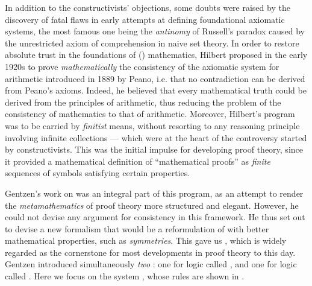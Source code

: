 In addition to the constructivists' objections, some doubts were raised by the
discovery of fatal flaws in early attempts at defining foundational axiomatic
systems, the most famous one being the \emph{antinomy} of Russell's paradox
caused by the unrestricted axiom of comprehension in naive set theory. In order
to restore absolute trust in the foundations of () mathematics, Hilbert
proposed in the early 1920s to prove \emph{mathematically} the consistency of
the axiomatic system for arithmetic introduced in 1889 by Peano, i.e.
that no contradiction can be derived from Peano's axioms. Indeed, he believed
that every mathematical truth could be derived from the principles of
arithmetic, thus reducing the problem of the consistency of mathematics to that
of arithmetic. Moreover, Hilbert's program was to be carried by \emph{finitist}
means, without resorting to any reasoning principle involving infinite
collections --- which were at the heart of the controversy started by
constructivists. This was the initial impulse for developing proof theory, since
it provided a mathematical definition of ``mathematical proofs'' as
\emph{finite} sequences of symbols satisfying certain properties.

Gentzen's work on  was an integral part of this program, as an
attempt to render the \emph{metamathematics} of proof theory more structured and
elegant. However, he could not devise any argument for consistency in this
framework. He thus set out to devise a new formalism that would be a
reformulation of  with better mathematical properties, such as
\emph{symmetries}. This gave us , which is widely
regarded as the cornerstone for most developments in proof theory to this day.
Gentzen introduced simultaneously \emph{two} : one for 
logic called , and one for  logic called . Here we
focus on the  system , whose rules are shown in
.

